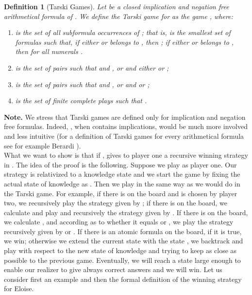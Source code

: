 \documentclass[copyright,creativecommons]{eptcs}
\newtheorem{definition}{Definition}
\begin{document}
\begin{definition}[Tarski Games]
\label{definition-TarskiGame} Let  be a closed
implication and negation free arithmetical formula of . We define the
Tarski
game for  as the game , where:
\begin{enumerate}

\item
 is the set of all subformula occurrences of ; that is,  is the smallest set of formulas such that, if either  or  belongs to , then ; if either  or  belongs to , then  for all numerals . \\

\item
 is the set of pairs  such that     and ,  or  and either  or
;\\

\item
 is the set of pairs  such that   and ,  or  and  or
;\\

\item
 is the set of finite complete plays  such that
.
\end{enumerate}
\end{definition}
\textbf{Note.} We stress that Tarski games are defined only for implication and negation free formulas. Indeed, , when  contains implications, would be much more involved and less intuitive (for a definition of Tarski games for every arithmetical formula see for example Berardi \cite{Ber2}).\\


What we want to show is that if ,
 gives to player one a recursive winning strategy in
. The idea of the proof is the following. Suppose we play as player one. Our strategy is relativized to a knowledge state and we start
the game by fixing the actual state of knowledge as .
Then we play in the same way as we would do in the Tarski game. For
example,  if there is  on the board and
 is chosen by player two, we recursively play the
strategy given by ; if there is  on the
board, we calculate  and play
 and recursively the strategy given by . If there is  on the board, we calculate , and according as to whether it equals  or , we play the strategy recursively given by  or .
If there is an atomic formula on the board, if it is true, we win; otherwise we extend the current state with the state , we backtrack and play with respect to the new state of knowledge and trying to keep as close as possible to the previous game.
Eventually, we will reach a state large enough to enable our
realizer to give always correct answers and we will win. Let us consider first an example and then the formal definition of the winning strategy for Eloise.\\
\end{document}
